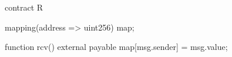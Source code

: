 \begin{soliditybox}[left=0pt,right=0pt,bottom=0pt]
contract R {
  mapping(address => uint256) map;

  function rcv() external payable {
    map[msg.sender] = msg.value;
  }
}
\end{soliditybox}